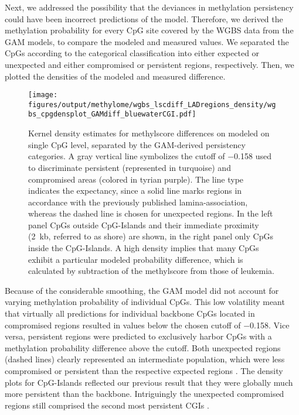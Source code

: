 Next, we addressed the possibility that the deviances in methylation persistency could have been incorrect predictions of the model. Therefore, we derived the methylation probability for every CpG site covered by the WGBS data from the GAM models, to compare the modeled and measured values. We separated the CpGs according to the categorical classification into either expected or unexpected and either compromised or persistent regions, respectively. Then, we plotted the densities of the modeled  and measured 	 difference.

\begin{figure}[!ht]
	\centering
	\texttt{[image: figures/output/methylome/wgbs\_lscdiff\_LADregions\_density/wgbs\_cpgdensplot\_GAMdiff\_bluewaterCGI.pdf]} 
	\caption{Kernel density estimates for methylscore differences on modeled on single CpG level, separated by the GAM-derived persistency categories. A gray vertical line symbolizes the cutoff of \num{-0.158} used to discriminate persistent (represented in turquoise) and compromised areas (colored in tyrian purple). The line type indicates the expectancy, since a solid line marks regions in accordance with the previously published lamina-association\cite{Meuleman2013}, whereas the dashed line is chosen for unexpected regions. In the left panel CpGs outside CpG-Islands and their immediate proximity (\SI{2}{\kilo b}, referred to as shore) are shown, in the right panel only CpGs inside the CpG-Islands. A high density implies that many CpGs exhibit a particular modeled probability difference, which is calculated by subtraction of the \dnmtchip \kitpos methylscore from those of \dnmtwt \kitpos leukemia.}
	\label{fig:wgbs_cpgdensplot_GAMdiff_bluewaterCGI}
\end{figure}

Because of the considerable smoothing, the GAM model did not account for varying methylation probability of individual CpGs. This low volatility meant that virtually all predictions for individual backbone CpGs located in compromised regions resulted in values below the chosen cutoff of \num{-0.158}. Vice versa, persistent regions were predicted to exclusively harbor CpGs with a methylation probability difference above the cutoff. Both unexpected regions (dashed lines) clearly represented an intermediate population, which were less compromised or persistent than the respective expected regions . The density plots for CpG-Islands reflected our previous result that they were globally much more persistent than the backbone. Intriguingly the unexpected compromised regions still comprised the second most persistent CGIs .

